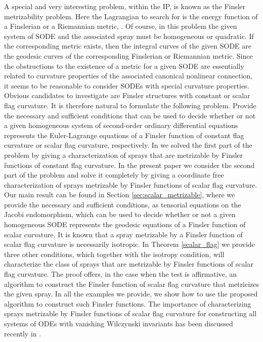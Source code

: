 \documentclass[oneside,english]{amsart}
\numberwithin{equation}{section}
\numberwithin{figure}{section}
\theoremstyle{plain}
\theoremstyle{plain}
\theoremstyle{definition}
\theoremstyle{plain}
\theoremstyle{plain}
\theoremstyle{plain}
\theoremstyle{remark}
\theoremstyle{remark}
\begin{document}
A special and very interesting problem, within the IP, is known as the Finsler
metrizability problem. Here the Lagrangian to search for is the energy
function of a Finslerian or a Riemannian metric, \cite{KS85, Muzsnay06,
  SV02}. Of course, in this problem the given system of SODE and the
associated spray must be homogeneous or quadratic. If the corresponding metric
exists, then the integral curves of the given SODE are the geodesic curves of
the corresponding Finslerian or Riemannian metric.  Since the obstructions to
the existence of a metric for a given SODE are essentially related to
curvature properties of the associated canonical nonlinear connection, it
seems to be reasonable to consider SODEs with special curvature properties.
Obvious candidates to investigate are Finsler structures with constant or
scalar flag curvature.  It is therefore natural to formulate the following
problem. Provide the necessary and sufficient conditions that can be used to
decide whether or not a given homogeneous system of second-order ordinary
differential equations represents the Euler-Lagrange equations of a Finsler
function of constant flag curvature or scalar flag curvature, respectively.
In \cite{BM13} we solved the first part of the problem by giving a
characterization of sprays that are metrizable by Finsler functions of
constant flag curvature.  In the present paper we consider the second part of
the problem and solve it completely by giving a coordinate free
characterization of sprays metrizable by Finsler functions of scalar flag
curvature.  Our main result can be found in Section
\ref{sec:scalar_metrizable}, where we provide the necessary and sufficient
conditions, as tensorial equations on the Jacobi endomorphism, which can be
used to decide whether or not a given homogeneous SODE represents the geodesic
equations of a Finsler function of scalar curvature.
It is known that a spray metrizable by a Finsler function of scalar flag
curvature is necessarily isotropic.  In Theorem \ref{scalar_flag} we provide
three other conditions, which together with the isotropy condition, will
characterize the class of sprays that are metrizable by Finsler functions of
scalar flag curvature.  The proof offers, in the case when the test is
affirmative, an algorithm to construct the Finsler function of scalar flag
curvature that metricizes the given spray. In all the examples we provide, we
show how to use the proposed algorithm to construct such Finsler
functions. The importance of characterizing sprays metrizable by Finsler
functions of scalar flag curvature for constructing all systems of ODEs with
vanishing Wilczynski invariants has been discussed recently in \cite{CDT12}.
\end{document}
